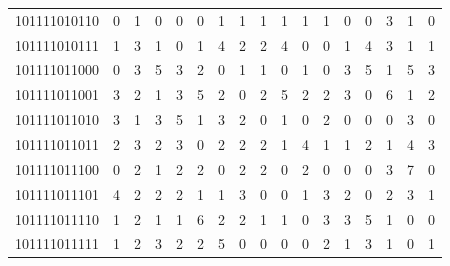 \documentclass[10pt,a4paper]{article}
\begin{document}
\begin{longtable}{ |c|c|c|c|c|c|c|c|c|c|c|c|c|c|c|c|c| }
    101111010110              & 0                            & 1                                & 0                            & 0                              & 0   & 1   & 1   & 1   & 1   & 1   & 1   & 0   & 0   & 3   & 1   & 0   \\
    101111010111              & 1                            & 3                                & 1                            & 0                              & 1   & 4   & 2   & 2   & 4   & 0   & 0   & 1   & 4   & 3   & 1   & 1   \\
    101111011000              & 0                            & 3                                & 5                            & 3                              & 2   & 0   & 1   & 1   & 0   & 1   & 0   & 3   & 5   & 1   & 5   & 3   \\
    101111011001              & 3                            & 2                                & 1                            & 3                              & 5   & 2   & 0   & 2   & 5   & 2   & 2   & 3   & 0   & 6   & 1   & 2   \\
    101111011010              & 3                            & 1                                & 3                            & 5                              & 1   & 3   & 2   & 0   & 1   & 0   & 2   & 0   & 0   & 0   & 3   & 0   \\
    101111011011              & 2                            & 3                                & 2                            & 3                              & 0   & 2   & 2   & 2   & 1   & 4   & 1   & 1   & 2   & 1   & 4   & 3   \\
    101111011100              & 0                            & 2                                & 1                            & 2                              & 2   & 0   & 2   & 2   & 0   & 2   & 0   & 0   & 0   & 3   & 7   & 0   \\
    101111011101              & 4                            & 2                                & 2                            & 2                              & 1   & 1   & 3   & 0   & 0   & 1   & 3   & 2   & 0   & 2   & 3   & 1   \\
    101111011110              & 1                            & 2                                & 1                            & 1                              & 6   & 2   & 2   & 1   & 1   & 0   & 3   & 3   & 5   & 1   & 0   & 0   \\
    101111011111              & 1                            & 2                                & 3                            & 2                              & 2   & 5   & 0   & 0   & 0   & 0   & 2   & 1   & 3   & 1   & 0   & 1   \\

\end{longtable}
\end{document}
